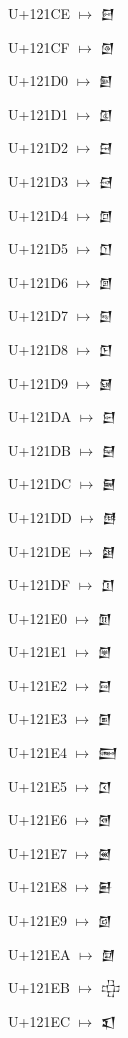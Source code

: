 {\noindent U+121CE  $\mapsto$ {\cufont 𒇎}\par
\noindent U+121CF  $\mapsto$ {\cufont 𒇏}\par
\noindent U+121D0  $\mapsto$ {\cufont 𒇐}\par
\noindent U+121D1  $\mapsto$ {\cufont 𒇑}\par
\noindent U+121D2  $\mapsto$ {\cufont 𒇒}\par
\noindent U+121D3  $\mapsto$ {\cufont 𒇓}\par
\noindent U+121D4  $\mapsto$ {\cufont 𒇔}\par
\noindent U+121D5  $\mapsto$ {\cufont 𒇕}\par
\noindent U+121D6  $\mapsto$ {\cufont 𒇖}\par
\noindent U+121D7  $\mapsto$ {\cufont 𒇗}\par
\noindent U+121D8  $\mapsto$ {\cufont 𒇘}\par
\noindent U+121D9  $\mapsto$ {\cufont 𒇙}\par
\noindent U+121DA  $\mapsto$ {\cufont 𒇚}\par
\noindent U+121DB  $\mapsto$ {\cufont 𒇛}\par
\noindent U+121DC  $\mapsto$ {\cufont 𒇜}\par
\noindent U+121DD  $\mapsto$ {\cufont 𒇝}\par
\noindent U+121DE  $\mapsto$ {\cufont 𒇞}\par
\noindent U+121DF  $\mapsto$ {\cufont 𒇟}\par
\noindent U+121E0  $\mapsto$ {\cufont 𒇠}\par
\noindent U+121E1  $\mapsto$ {\cufont 𒇡}\par
\noindent U+121E2  $\mapsto$ {\cufont 𒇢}\par
\noindent U+121E3  $\mapsto$ {\cufont 𒇣}\par
\noindent U+121E4  $\mapsto$ {\cufont 𒇤}\par
\noindent U+121E5  $\mapsto$ {\cufont 𒇥}\par
\noindent U+121E6  $\mapsto$ {\cufont 𒇦}\par
\noindent U+121E7  $\mapsto$ {\cufont 𒇧}\par
\noindent U+121E8  $\mapsto$ {\cufont 𒇨}\par
\noindent U+121E9  $\mapsto$ {\cufont 𒇩}\par
\noindent U+121EA  $\mapsto$ {\cufont 𒇪}\par
\noindent U+121EB  $\mapsto$ {\cufont 𒇫}\par
\noindent U+121EC  $\mapsto$ {\cufont 𒇬}\par
}
